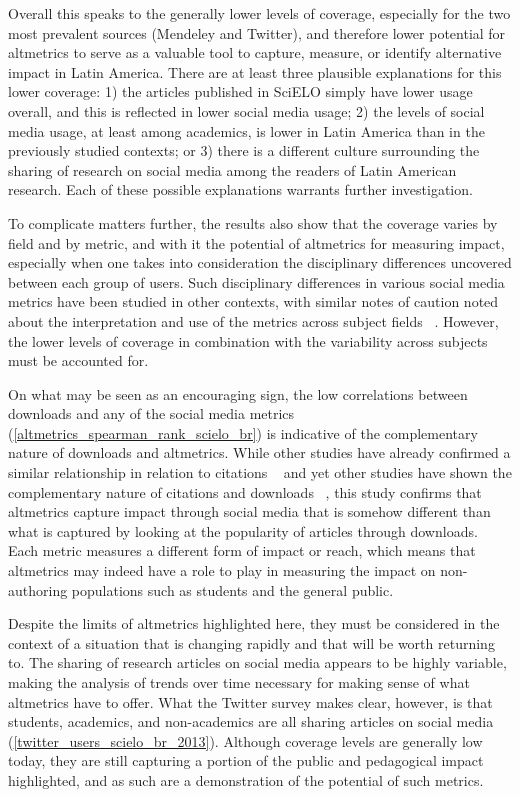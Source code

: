 Overall this speaks to the generally lower levels of coverage, especially for the two most prevalent sources (Mendeley and Twitter), and therefore lower potential for altmetrics to serve as a valuable tool to capture, measure, or identify alternative impact in Latin America. There are at least three plausible explanations for this lower coverage: 1) the articles published in SciELO simply have lower usage overall, and this is reflected in lower social media usage; 2) the levels of social media usage, at least among academics, is lower in Latin America than in the previously studied contexts; or 3) there is a different culture surrounding the sharing of research on social media among the readers of Latin American research. Each of these possible explanations warrants further investigation.

To complicate matters further, the results also show that the coverage varies by field and by metric, and with it the potential of altmetrics for measuring impact, especially when one takes into consideration the disciplinary differences uncovered between each group of users. Such disciplinary differences in various social media metrics have been studied in other contexts, with similar notes of caution noted about the interpretation and use of the metrics across subject fields ~\citep{Holmberg2014,Costas2014}. However, the lower levels of coverage in combination with the variability across subjects must be accounted for.

On what may be seen as an encouraging sign, the low correlations between downloads and any of the social media metrics (\autoref{altmetrics_spearman_rank_scielo_br}) is indicative of the complementary nature of downloads and altmetrics. While other studies have already confirmed a similar relationship in relation to citations ~\citep{Torres-Salinas2013,Costas2014,Haustein2013,Haustein2014b,Eysenbach2011} and yet other studies have shown the complementary nature of citations and downloads ~\citep{Bollen2008a,Bollen2009}, this study confirms that altmetrics capture impact through social media that is somehow different than what is captured by looking at the popularity of articles through downloads. Each metric measures a different form of impact or reach, which means that altmetrics may indeed have a role to play in measuring the impact on non-authoring populations such as students and the general public.

Despite the limits of altmetrics highlighted here, they must be considered in the context of a situation that is changing rapidly and that will be worth returning to. The sharing of research articles on social media appears to be highly variable, making the analysis of trends over time necessary for making sense of what altmetrics have to offer. What the Twitter survey makes clear, however, is that students, academics, and non-academics are all sharing articles on social media (\autoref{twitter_users_scielo_br_2013}). Although coverage levels are generally low today, they are still capturing a portion of the public and pedagogical impact highlighted, and as such are a demonstration of the potential of such metrics.

